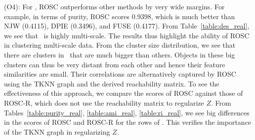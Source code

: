 (O4): For \coil, ROSC outperforms other methods by very wide margins.
For example, in terms of purity, ROSC scores 0.9398, which is much better than
NJW (0.4115), DPIE (0.3496), and FUSE (0.4177).
From Table~\ref{table:des_real}, we see that \coil\ is highly multi-scale. 
The results thus highlight the ability of ROSC in clustering multi-scale data.
From the cluster size distribution, we see that there are clusters in \coil\ that are much bigger
than others. Objects in these big clusters can thus be very distant from each other and hence their
feature similarities are small.
Their correlations are alternatively captured by ROSC 
using the TKNN graph and the derived reachability matrix.
To see the effectiveness  of this approach, 
we compare the scores of ROSC against those of ROSC-R, which does not use the reachability matrix
to regularize $Z$. 
From Tables~\ref{table:purity_real}, \ref{table:ami_real}, \ref{table:ri_real}, we see big differences in
the scores of ROSC and ROSC-R for the rows of \coil. 
This verifies the importance of the TKNN graph in regularizing $Z$.


